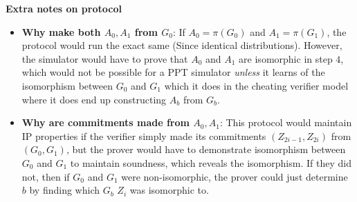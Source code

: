 \documentclass[11pt]{article}
\begin{document}
\textbf{Extra notes on protocol}
\begin{itemize}
    \item \textbf{Why make both $A_0,A_1$ from $G_0$}: If $A_0 = \pi(G_0)$ and $A_1 = \pi(G_1)$, the protocol would run the exact same (Since identical distributions). However, the simulator would have to prove that $A_0$ and $A_1$ are isomorphic in step $4$, which would not be possible for a PPT simulator \textit{unless} it learns of the isomorphism between $G_0$ and $G_1$ which it does in the cheating verifier model where it does end up constructing $A_b$ from $G_b$.
    \item \textbf{Why are commitments made from $A_0,A_1$}: This protocol would maintain IP properties if the verifier simply made its commitments $(Z_{2i-1},Z_{2i})$ from $(G_0,G_1)$, but the prover would have to demonstrate isomorphism between $G_0$ and $G_1$ to maintain soundness, which reveals the isomorphism. If they did not, then if $G_0$ and $G_1$ were non-isomorphic, the prover could just determine $b$ by finding which $G_b$ $Z_i$ was isomorphic to.
\end{itemize}
\end{document}

